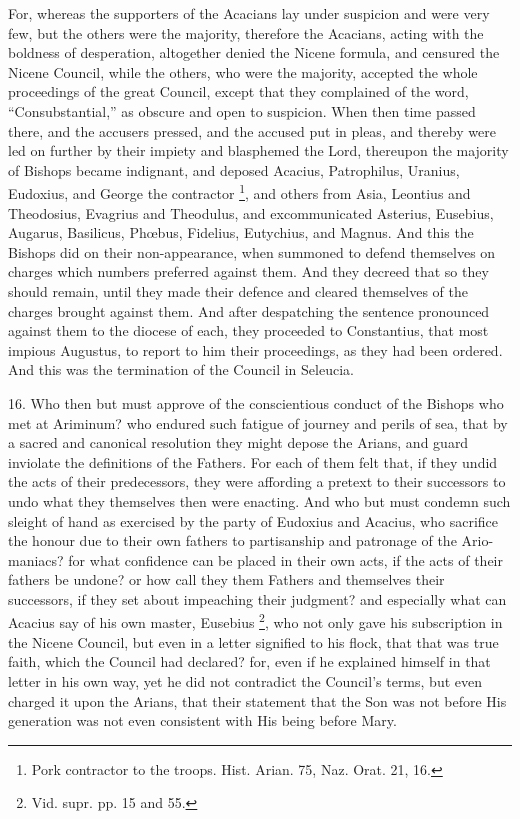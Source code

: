 For, whereas the supporters of the Acacians lay under suspicion and
were very few, but the others were the majority, therefore the
Acacians, acting with the boldness of desperation, altogether denied
the Nicene formula, and censured the Nicene Council, while the others,
who were the majority, accepted the whole proceedings of the great
Council, except that they complained of the word, ``Consubstantial,'' as
obscure and open to suspicion. When then time passed there, and the
accusers pressed, and the accused put in pleas, and thereby were led
on further by their impiety and blasphemed the Lord, thereupon the
majority of Bishops became indignant, and deposed Acacius, Patrophilus,
Uranius, Eudoxius, and George the contractor \footnote{Pork contractor to the troops. Hist. Arian. 75, Naz. Orat. 21, 16.}, and others from Asia, Leontius and Theodosius, Evagrius and
Theodulus, and excommunicated Asterius, Eusebius, Augarus, Basilicus,
Phœbus, Fidelius, Eutychius, and Magnus. And this the Bishops did on
their non-appearance, when summoned to defend themselves on charges
which numbers preferred against them. And they decreed that so they
should remain, until they made their defence and cleared themselves of
the charges brought against them. And after despatching the sentence
pronounced against them to the diocese of each, they proceeded to
Constantius, that most impious Augustus, to report to him their
proceedings, as they had been ordered. And this was the termination of
the Council in Seleucia.

16. Who then but must approve
of the conscientious conduct of the Bishops who met at Ariminum? who
endured such fatigue of journey and perils of sea, that by a sacred
and canonical resolution they might depose the Arians, and guard
inviolate the definitions of the Fathers. For each of them felt that,
if they undid the acts of their predecessors, they were affording a
pretext to their successors to undo what they themselves then were
enacting. And who but must condemn such sleight of hand as exercised
by the party of Eudoxius and Acacius, who sacrifice the honour due to
their own fathers to partisanship and patronage of the Ario-maniacs?
for what confidence can be placed in their own acts, if the acts of
their fathers be undone? or how call they them Fathers and themselves
their successors, if they set about impeaching their judgment? and
especially what can Acacius say of his own master, Eusebius \footnote{Vid. supr. pp. 15 and 55.}, who not only gave his subscription in the Nicene Council, but
even in a letter signified to his flock, that that was true faith,
which the Council had declared? for, even if he explained himself in
that letter in his own way, yet he did not contradict the Council's
terms, but even charged it upon the Arians, that their statement that
the Son was not before His generation was not even consistent with His
being before Mary.

